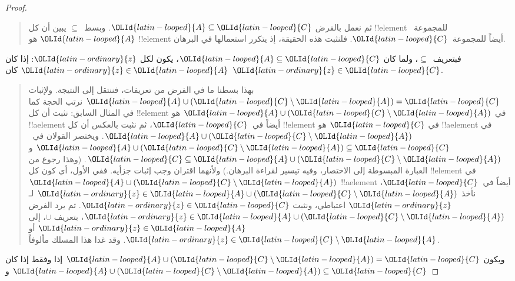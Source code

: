 \documentclass[../../../include/open-logic-section]{subfiles}
\begin{document}
\begin{proof}
\begin{quote}
    ثم نعمل بالفرض $\OLId{latin-looped}{A} \subseteq \OLId{latin-looped}{C}$. وبسط~$\subseteq$ يبين أن كل
    !!{element} للمجموعة~$\OLId{latin-looped}{A}$ هو !!{element} أيضاً للمجموعة~$\OLId{latin-looped}{C}$.
    فلنثبت هذه الحقيقة، إذ يتكرر استعمالها في البرهان.
  \end{quote}
  فبتعريف~$\subseteq$، ولما كان $\OLId{latin-looped}{A} \subseteq \OLId{latin-looped}{C}$، يكون لكل $\OLId{latin-ordinary}{z}$: إذا
  كان $\OLId{latin-ordinary}{z} \in \OLId{latin-looped}{A}$ كان $\OLId{latin-ordinary}{z} \in \OLId{latin-looped}{C}$.
  \begin{quote}
    بهذا بسطنا ما في الفرض من تعريفات، فننتقل إلى النتيجة. ولإثبات
    $\OLId{latin-looped}{A} \cup (\OLId{latin-looped}{C} \setminus \OLId{latin-looped}{A}) = \OLId{latin-looped}{C}$ نرتب الحجة كما في المثال السابق:
    نثبت أن كل !!{element} في $\OLId{latin-looped}{A} \cup (\OLId{latin-looped}{C} \setminus \OLId{latin-looped}{A})$ هو
    !!a{element} أيضاً في~$\OLId{latin-looped}{C}$، ثم نثبت بالعكس أن كل !!{element} في
    $\OLId{latin-looped}{C}$ هو !!a{element} في $\OLId{latin-looped}{A} \cup (\OLId{latin-looped}{C} \setminus \OLId{latin-looped}{A})$. ويختصر القولان
    في~$\OLId{latin-looped}{A} \cup (\OLId{latin-looped}{C} \setminus \OLId{latin-looped}{A}) \subseteq \OLId{latin-looped}{C}$ و
    $\OLId{latin-looped}{C} \subseteq \OLId{latin-looped}{A} \cup (\OLId{latin-looped}{C} \setminus \OLId{latin-looped}{A})$. (وهذا رجوع من العبارة
    المبسوطة إلى الاختصار، وفيه تيسير لقراءة البرهان.) ولأنهما اقتران
    وجب إثبات جزأيه. ففي الأول، أي كون كل !!{element} في
    $\OLId{latin-looped}{A} \cup (\OLId{latin-looped}{C} \setminus \OLId{latin-looped}{A})$ !!a{element} أيضاً في~$\OLId{latin-looped}{C}$، نأخذ
    $\OLId{latin-ordinary}{z} \in \OLId{latin-looped}{A} \cup (\OLId{latin-looped}{C} \setminus \OLId{latin-looped}{A})$ لـ$\OLId{latin-ordinary}{z}$ اعتباطي، ونثبت
    $\OLId{latin-ordinary}{z} \in \OLId{latin-looped}{C}$. ثم يرد الفرض $\OLId{latin-ordinary}{z} \in \OLId{latin-looped}{A} \cup (\OLId{latin-looped}{C} \setminus \OLId{latin-looped}{A})$، بتعريف
    $\cup$، إلى $\OLId{latin-ordinary}{z} \in \OLId{latin-looped}{A}$ أو
    $\OLId{latin-ordinary}{z} \in \OLId{latin-looped}{C} \setminus \OLId{latin-looped}{A}$. وقد غدا هذا المسلك مألوفاً.
    \end{quote}
  ويكون $\OLId{latin-looped}{A} \cup (\OLId{latin-looped}{C} \setminus \OLId{latin-looped}{A}) = \OLId{latin-looped}{C}$ إذا وفقط إذا كان
  $\OLId{latin-looped}{A} \cup (\OLId{latin-looped}{C} \setminus \OLId{latin-looped}{A}) \subseteq \OLId{latin-looped}{C}$ و

\end{proof}
\end{document}
